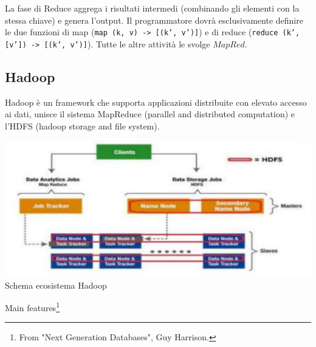 \documentclass[a4page, 11pt]{article}
\begin{document}
La fase di Reduce aggrega i risultati intermedi (combinando gli elementi con la stessa chiave) e genera l’output. Il programmatore dovrà esclusivamente definire le due funzioni di map (\texttt{map (k, v) -> [(k’, v’)]}) e di reduce (\texttt{reduce (k’, [v’]) -> [(k’, v’)]}). Tutte le altre attività le svolge  $MapRed$.
\subsection{Hadoop}
Hadoop è un framework che supporta applicazioni distribuite con elevato accesso ai dati, unisce il sistema MapReduce (parallel and distributed computation) e l’HDFS (hadoop storage and file system).
\begin{center}
\includegraphics[scale=0.70]{IMAGE9.png}\\
Schema ecosistema Hadoop
\end{center}
Main features\footnote{From "Next Generation
Databases", Guy Harrison.} %
\end{document}

